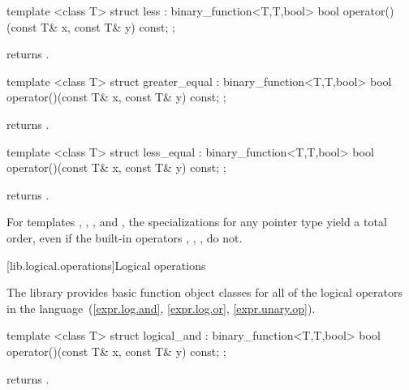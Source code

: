 %
\begin{itemdecl}
template <class T> struct less : binary_function<T,T,bool> {
  bool operator()(const T& x, const T& y) const;
};
\end{itemdecl}

\begin{itemdescr}
\pnum
{} returns .
\end{itemdescr}

%
\begin{itemdecl}
template <class T> struct greater_equal : binary_function<T,T,bool> {
  bool operator()(const T& x, const T& y) const;
};
\end{itemdecl}

\begin{itemdescr}
\pnum
{} returns .
\end{itemdescr}

%
\begin{itemdecl}
template <class T> struct less_equal : binary_function<T,T,bool> {
  bool operator()(const T& x, const T& y) const;
};
\end{itemdecl}

\begin{itemdescr}
\pnum
{} returns .
\end{itemdescr}

\pnum
For templates , , , and
, the specializations for any pointer type yield a total order,
even if the built-in operators \tcode{<}, \tcode{>}, \tcode{<=}, \tcode{>=}
do not.

[lib.logical.operations]{Logical operations}

\pnum
The library provides basic function object classes for all of the logical
operators in the language~(\ref{expr.log.and}, \ref{expr.log.or}, \ref{expr.unary.op}).

%
\begin{itemdecl}
template <class T> struct logical_and : binary_function<T,T,bool> {
  bool operator()(const T& x, const T& y) const;
};
\end{itemdecl}

\begin{itemdescr}
\pnum
{} returns .
\end{itemdescr}

